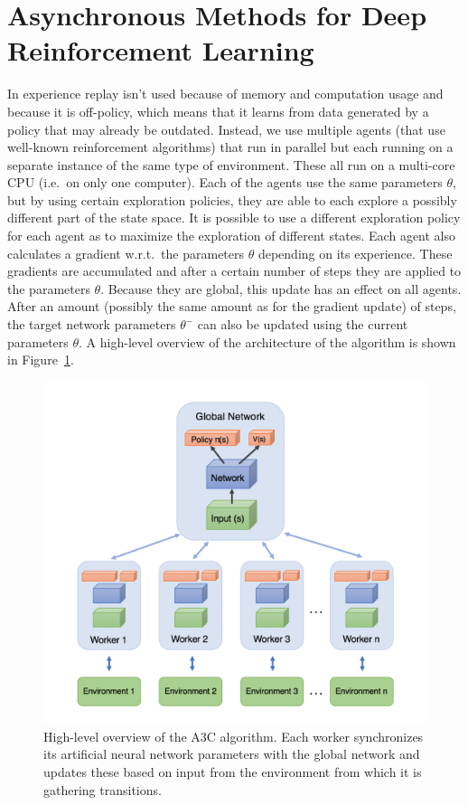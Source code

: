 \section{Asynchronous Methods for Deep Reinforcement Learning}
\label{sec:a3c}
In \cite{Mnih2016AsynchronousLearning} experience replay isn't used because of memory and computation usage and because it is off-policy, which means that it learns from data generated by a policy that may already be outdated.
Instead, we use multiple agents (that use well-known reinforcement algorithms) that run in parallel but each running on a separate instance of the same type of environment.
These all run on a multi-core CPU (i.e.\ on only one computer).
Each of the agents use the same parameters $\theta$, but by using certain exploration policies, they are able to each explore a possibly different part of the state space.
It is possible to use a different exploration policy for each agent as to maximize the exploration of different states.
Each agent also calculates a gradient w.r.t.\ the parameters $\theta$ depending on its experience.
These gradients are accumulated and after a certain number of steps they are applied to the parameters $\theta$.
Because they are global, this update has an effect on all agents.
After an amount (possibly the same amount as for the gradient update) of steps, the target network parameters $\theta^{-}$ can also be updated using the current parameters $\theta$. A high-level overview of the architecture of the algorithm is shown in Figure~\ref{fig:a3carchitecture}.\\
\begin{figure}[htb]
    \centering
    \includegraphics[width=.8\linewidth]{images/A3Carchitecture.png}
    \caption[High-level overview of the A3C algorithm]{High-level overview of the A3C algorithm. Each worker synchronizes its artificial neural network parameters with the global network and updates these based on input from the environment from which it is gathering transitions.}
    \label{fig:a3carchitecture}
\end{figure}
